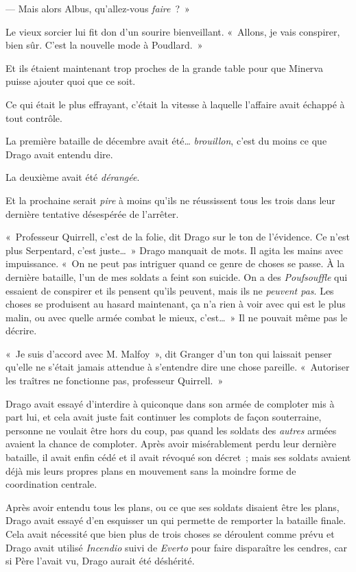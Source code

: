 --- Mais alors Albus, qu'allez-vous \emph{faire}~?~»

Le vieux sorcier lui fit don d'un sourire bienveillant. «~Allons, je vais conspirer, bien sûr. C'est la nouvelle mode à Poudlard.~»

Et ils étaient maintenant trop proches de la grande table pour que Minerva puisse ajouter quoi que ce soit.

\later

Ce qui était le plus effrayant, c'était la vitesse à laquelle l'affaire avait échappé à tout contrôle.

La première bataille de décembre avait été… \emph{brouillon}, c'est du moins ce que Drago avait entendu dire.

La deuxième avait été \emph{dérangée}.

Et la prochaine serait \emph{pire} à moins qu'ils ne réussissent tous les trois dans leur dernière tentative désespérée de l'arrêter.

«~Professeur Quirrell, c'est de la folie, dit Drago sur le ton de l'évidence. Ce n'est plus Serpentard, c'est juste…~» Drago manquait de mots. Il agita les mains avec impuissance. «~On ne peut pas intriguer quand ce genre de choses se passe. À la dernière bataille, l'un de mes soldats a feint son suicide. On a des \emph{Poufsouffle} qui essaient de conspirer et ils pensent qu'ils peuvent, mais ils ne \emph{peuvent pas}. Les choses se produisent au hasard maintenant, ça n'a rien à voir avec qui est le plus malin, ou avec quelle armée combat le mieux, c'est…~» Il ne pouvait même pas le décrire.

«~Je suis d'accord avec M. Malfoy~», dit Granger d'un ton qui laissait penser qu'elle ne s'était jamais attendue à s'entendre dire une chose pareille. «~Autoriser les traîtres ne fonctionne pas, professeur Quirrell.~»

Drago avait essayé d'interdire à quiconque dans son armée de comploter mis à part lui, et cela avait juste fait continuer les complots de façon souterraine, personne ne voulait être hors du coup, pas quand les soldats des \emph{autres} armées avaient la chance de comploter. Après avoir misérablement perdu leur dernière bataille, il avait enfin cédé et il avait révoqué son décret~; mais ses soldats avaient déjà mis leurs propres plans en mouvement sans la moindre forme de coordination centrale.

Après avoir entendu tous les plans, ou ce que ses soldats disaient être les plans, Drago avait essayé d'en esquisser un qui permette de remporter la bataille finale. Cela avait nécessité que bien plus de trois choses se déroulent comme prévu et Drago avait utilisé \emph{Incendio} suivi de \emph{Everto} pour faire disparaître les cendres, car si Père l'avait vu, Drago aurait été déshérité.

